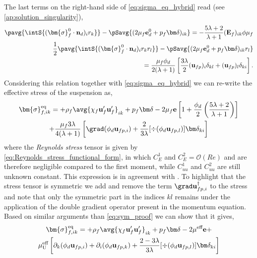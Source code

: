 The last terms on the right-hand side of \ref{eq:sigma_eq_hybrid} read (see \ref{ap:solution_singularity}), 
\begin{align*}
    \pavg{\intS{(\bm{\sigma}_f^0 \cdot \textbf{n}_d)_ir_k}} -
    \pSavg{{(2 \mu_f \textbf{e}_d^0+ p_f\bm\delta)_{ik}}} 
    = 
    - \frac{5\lambda +2}{\lambda +1}
    (\textbf{E}_f)_{ik} \phi \mu_f
    \\
    \frac{1}{2}\pavg{\intS{(\bm{\sigma}_f^0 \cdot \textbf{n}_d)_ir_kr_l}} -
    \pSavg{{(2 \mu_f \textbf{e}_d^0+ p_f\bm\delta)_{ik} r_l}} \\
    = 
    \frac{\mu_f\phi_d}{2(\lambda +1) }
    \left[
        \frac{3\lambda}{2} 
        (\textbf{u}_{fp})_i\delta_{kl}
        +  (\textbf{u}_{fp})_l\delta_{ki}
    \right]. 
\end{align*}
Considering this relation together with \ref{eq:sigma_eq_hybrid} we can re-write the effective stress of the suspension as, 
\begin{multline}
    \bm{\sigma}^\text{eq}_{f,ik} =
    + \rho_f\avg{\chi_f\textbf{u}_f'\textbf{u}_f'}_{ik} 
    + p_f \bm\delta
    - 2 \mu_f \textbf{e}\left[
        1
        +\frac{\phi_d}{2}\left(
            \frac{5\lambda +2}{\lambda +1}
        \right)
    \right]\\
    + 
    \frac{\mu_f 3\lambda}{4(\lambda +1) }
    \left[
        \grad (\phi_d\textbf{u}_{fp,i})
        +  
        \frac{2}{3\lambda} 
        [\div (\phi_d\textbf{u}_{fp,l})]\bm\delta_{ki}
    \right]
\end{multline} 
where the \textit{Reynolds stress} tensor is given by \ref{eq:Reynolds_stress_functional_form}, in which $C_E^1$ and $C_E^2 = \mathcal{O}(Re)$ and are therefore negligible compared to the first moment, while $C_{uu}^1$ and $C_{uu}^2$ are still unknown constant. 
This expression is in agreement with \citet[Appendix A]{zhang1997momentum}. 
To highlight that the stress tensor is symmetric we add and remove the term $ \grad \textbf{u}_{fp,i}^\dagger$  to the stress and note that only the symmetric part in the indices $kl$ remains under the application of the double gradient operator present in the momentum equation. 
Based on similar arguments than \ref{eq:sym_proof} we can show that it gives, 
\begin{multline}
    \bm{\sigma}^\text{eq}_{f,ik} =
    + \rho_f\avg{\chi_f\textbf{u}_f'\textbf{u}_f'}_{ik} 
    + p_f \bm\delta
    - 2\mu^\text{eff} \textbf{e}
    + \\
    \mu_\text{U}^\text{eff}
    \left[
        \partial_k   (\phi_d\textbf{u}_{fp,i})
        + \partial_i (\phi_d\textbf{u}_{fp,k})
        + \frac{2-3\lambda}{3\lambda}  [\div (\phi_d\textbf{u}_{fp,l})]\bm\delta_{ki}
    \right]
    \label{eq:fluid_phase_stress}
\end{multline} 
